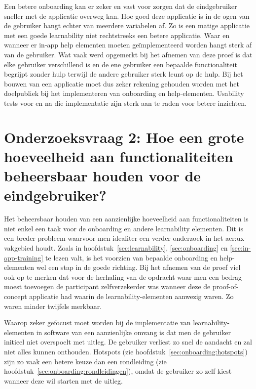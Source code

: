 Een betere onboarding kan er zeker en vast voor zorgen dat de eindgebruiker sneller met de applicatie overweg kan. Hoe goed deze applicatie is in de ogen van de gebruiker hangt echter van meerdere variabelen af. Zo is een matige applicatie met een goede learnability niet rechtstreeks een betere applicatie. Waar en wanneer er in-app help elementen moeten geïmplementeerd worden hangt sterk af van de gebruiker. Wat vaak werd opgemerkt bij het afnemen van deze proef is dat elke gebruiker verschillend is en de ene gebruiker een bepaalde functionaliteit begrijpt zonder hulp terwijl de andere gebruiker sterk leunt op de hulp. Bij het bouwen van een applicatie moet dus zeker rekening gehouden worden met het doelpubliek bij het implementeren van onboarding en help-elementen. Usability tests voor en na die implementatie zijn sterk aan te raden voor betere inzichten.

\section[Onderzoeksvraag 2]{Onderzoeksvraag 2: Hoe een grote hoeveelheid aan functionaliteiten beheersbaar houden voor de eindgebruiker?}
\label{sec:onderzoeksvraag-2}

Het beheersbaar houden van een aanzienlijke hoeveelheid aan functionaliteiten is niet enkel een taak voor de onboarding en andere learnability elementen. Dit is een breder probleem waarvoor men idealiter een verder onderzoek in het \acrshort{acr:ux}-vakgebied houdt. Zoals in hoofdstuk~\ref{sec:learnability}, \ref{sec:onboarding} en \ref{sec:in-app-training} te lezen valt, is het voorzien van bepaalde onboarding en help-elementen wel een stap in de goede richting. Bij het afnemen van de proef viel ook op te merken dat voor de herhaling van de opdracht waar men een bedrag moest toevoegen de participant zelfverzekerder was wanneer deze de proof-of-concept applicatie had waarin de learnability-elementen aanwezig waren. Zo waren minder twijfels merkbaar.

Waarop zeker gefocust moet worden bij de implementatie van learnability-elementen in software van een aanzienlijke omvang is dat men de gebruiker initieel niet overspoelt met uitleg. De gebruiker verliest zo snel de aandacht en zal niet alles kunnen onthouden. Hotspots (zie hoofdstuk~\ref{sec:onboarding:hotspots}) zijn zo vaak een betere keuze dan een rondleiding (zie hoofdstuk~\ref{sec:onboarding:rondleidingen}), omdat de gebruiker zo zelf kiest wanneer deze wil starten met de uitleg.

